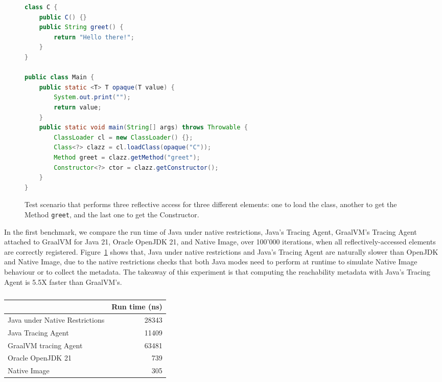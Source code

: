 \begin{figure}[ht]
    \centering
\begin{lstlisting}[language=Java]
class C {
    public C() {}
    public String greet() {
        return "Hello there!";
    }
}

public class Main {
    public static <T> T opaque(T value) {
        System.out.print("");
        return value;
    }
    public static void main(String[] args) throws Throwable {
        ClassLoader cl = new ClassLoader() {};
        Class<?> clazz = cl.loadClass(opaque("C"));
        Method greet = clazz.getMethod("greet");
        Constructor<?> ctor = clazz.getConstructor();
    }
}
\end{lstlisting}
    \caption{Test scenario that performs three reflective access for three different elements: one to load the class, another to get the Method \texttt{greet}, and the last one to get the Constructor.}
    \label{fig:benchmark}
\end{figure}

In the first benchmark, we compare the run time of Java under native restrictions, Java's Tracing Agent, GraalVM's Tracing Agent attached to GraalVM for Java 21, Oracle OpenJDK 21, and Native Image, over 100'000 iterations, when all reflectively-accessed elements are correctly registered. 
Figure~\ref{tab:benchmark_1} shows that, Java under native restrictions and Java's Tracing Agent are naturally slower than OpenJDK and Native Image, due to the native restrictions checks that both Java modes need to perform at runtime to simulate Native Image behaviour or to collect the metadata. The takeaway of this experiment is that computing the reachability metadata with Java's Tracing Agent is 5.5X faster than GraalVM's.

\begin{table}[ht]
\centering
\begin{tabular}{@{}lr@{}}
\toprule
                               & \multicolumn{1}{l}{Run time (ns)} \\ \midrule
Java under Native Restrictions & 28343                             \\
Java Tracing Agent             & 11409                             \\
GraalVM tracing Agent          & 63481                             \\
Oracle OpenJDK 21              & 739                               \\
Native Image                   & 305                               \\ \bottomrule
\end{tabular}
\caption{}
\label{tab:benchmark_1}
\end{table}

